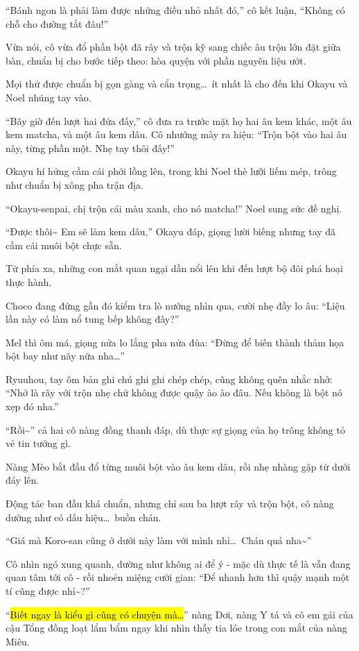 \documentclass[../main.tex]{subfiles}
\begin{document}
``Bánh ngon là phải làm được những điều nhỏ nhất đó,'' cô kết luận, ``Không có chỗ cho đường tắt đâu!''

Vừa nói, cô vừa đổ phần bột đã rây và trộn kỹ sang chiếc âu trộn lớn đặt giữa bàn, chuẩn bị cho bước tiếp theo: hòa quyện với phần nguyên liệu ướt.

Mọi thứ được chuẩn bị gọn gàng và cẩn trọng\dots\ ít nhất là cho đến khi Okayu và Noel nhúng tay vào.

``Bây giờ đến lượt hai đứa đấy,'' cô đưa ra trước mặt họ hai âu kem khác, một âu kem matcha, và một âu kem dâu. Cô nhướng mày ra hiệu: ``Trộn bột vào hai âu này, từng phần một. Nhẹ tay thôi đấy!''

Okayu hí hửng cầm cái phới lồng lên, trong khi Noel thè lưỡi liếm mép, trông như chuẩn bị xông pha trận địa.

``Okayu-senpai, chị trộn cái màu xanh, cho nó matcha!'' Noel sung sức đề nghị.

``Được thôi\~{} Em sẽ làm kem dâu,'' Okayu đáp, giọng lười biếng nhưng tay đã cầm cái muôi bột chực sẵn.

Từ phía xa, những con mắt quan ngại dần nổi lên khi đến lượt bộ đôi phá hoại thực hành.

Choco đang đứng gần đó kiểm tra lò nướng nhìn qua, cười nhẹ đầy lo âu: ``Liệu lần này có làm nổ tung bếp không đây?''

Mel thì ôm má, giọng nửa lo lắng pha nửa đùa: ``Đừng để biến thành thảm họa bột bay như nãy nữa nha\dots''

Ryuuhou, tay ôm bản ghi chú ghi ghi chép chép, cũng không quên nhắc nhở: ``Nhớ là rây với trộn nhẹ chứ không được quậy ào ào đâu. Nếu không là bột nó xẹp đó nha.''

``Rồi\~{}'' cả hai cô nàng đồng thanh đáp, dù thực sự giọng của họ trông không tỏ vẻ tin tưởng gì.

Nàng Mèo bắt đầu đổ từng muôi bột vào âu kem dâu, rồi nhẹ nhàng gập từ dưới đáy lên.

Động tác ban đầu khá chuẩn, nhưng chỉ sau ba lượt rây và trộn bột, cô nàng dường như có dấu hiệu\dots\ buồn chán.

``Giá mà Koro-san cũng ở dưới này làm với mình nhỉ\dots\ Chán quá nha\~{}''

Cô nhìn ngó xung quanh, dường như không ai để ý - mặc dù thực tế là vẫn đang quan tâm tới cô - rồi nhoẻn miệng cười gian: ``Để nhanh hơn thì quậy mạnh một tí cũng được nhỉ\~{}?''

``\hl{Biết ngay là kiểu gì cũng có chuyện mà\dots}'' nàng Dơi, nàng Y tá và cô em gái của cậu Tổng đồng loạt lẩm bẩm ngay khi nhìn thấy tia lóe trong con mắt của nàng Miêu.
\end{document}
